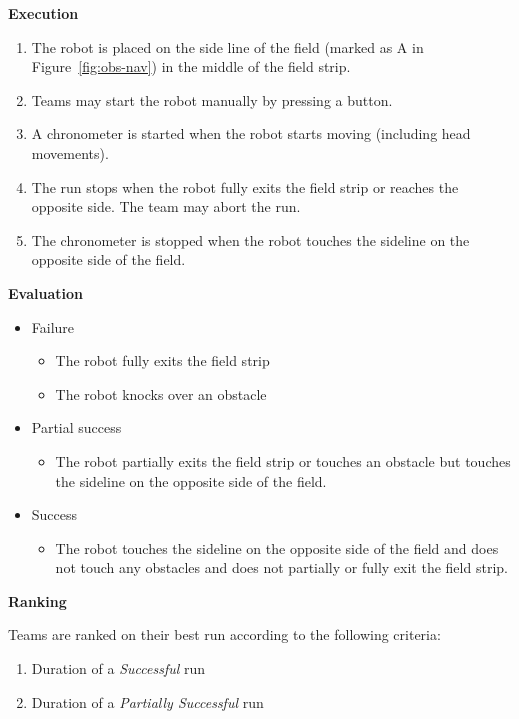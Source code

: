\vspace{2em}
{\bfseries Execution}
\begin{enumerate}
\item The robot is placed on the side line of the field (marked as A in Figure~\ref{fig:obs-nav}) in the middle of the field strip.
\item Teams may start the robot manually by pressing a button.
\item A chronometer is started when the robot starts moving (including head movements).
\item The run stops when the robot fully exits the field strip or reaches the opposite side. The team may abort the run.
\item The chronometer is stopped when the robot touches the sideline on the opposite side of the field.

\end{enumerate}
\vspace{2em}
{\bfseries Evaluation}
\begin{itemize}
\item Failure
\begin{itemize}
\item The robot fully exits the field strip
\item The robot knocks over an obstacle
\end{itemize}
\item Partial success
\begin{itemize}
\item The robot partially exits the field strip or touches an obstacle but touches the sideline on the opposite side of the field.
\end{itemize}
\item Success
\begin{itemize}
\item The robot touches the sideline on the opposite side of the field and does not touch any obstacles and does not partially or fully exit the field strip.
\end{itemize}
\end{itemize}



\vspace{2em}
{\bfseries Ranking}

Teams are ranked on their best run according to the following criteria:
\begin{enumerate}
\item Duration of a \textit{Successful} run
\item Duration of a \textit{Partially Successful} run
\end{enumerate}